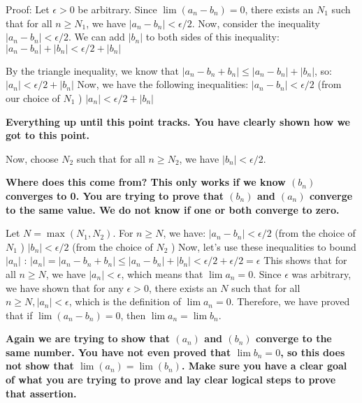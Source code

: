 \documentclass{report}
\begin{document}


Proof:
Let $\epsilon>0$ be arbitrary. Since $\lim \left(a_n-b_n\right)=0$, there exists an $N_1$ such that for all $n \geq N_1$, we have $\left|a_n-b_n\right|<\epsilon / 2$. Now, consider the inequality $\left|a_n-b_n\right|<\epsilon / 2$. We can add $\left|b_n\right|$ to both sides of this inequality: $\left|a_n-b_n\right|+\left|b_n\right|<\epsilon / 2+\left|b_n\right|$

By the triangle inequality, we know that $\left|a_n-b_n+b_n\right| \leq\left|a_n-b_n\right|+\left|b_n\right|$, so: $\left|a_n\right|<\epsilon / 2+\left|b_n\right|$ Now, we have the following inequalities: $\left|a_n-b_n\right|<\epsilon / 2$ (from our choice of $N_1$ )
$\left|a_n\right|<\epsilon / 2+\left|b_n\right|$
\par
\textbf{Everything up until this point tracks. You have clearly shown how we got to this point.}
\par
Now, choose $N_2$ such that for all $n \geq N_2$, we have $\left|b_n\right|<\epsilon / 2$. 
\par
\textbf{Where does this come from? This only works if we know $(b_n)$ converges to 0. You are trying to prove that $(b_n)$ and $(a_n)$ converge to the same value. We do not know if one or both converge to zero.}

Let $N=\max \left(N_1, N_2\right)$. For $n \geq N$, we have: $\left|a_n-b_n\right|<\epsilon / 2$ (from the choice of $N_1$ )
$\left|b_n\right|<\epsilon / 2$ (from the choice of $N_2$ )
Now, let's use these inequalities to bound $\left|a_n\right|$ :
$\left|a_n\right|=\left|a_n-b_n+b_n\right| \leq\left|a_n-b_n\right|+\left|b_n\right|<\epsilon / 2+\epsilon / 2=\epsilon$
This shows that for all $n \geq N$, we have $\left|a_n\right|<\epsilon$, which means that $\lim a_n=0$.
Since $\epsilon$ was arbitrary, we have shown that for any $\epsilon>0$, there exists an $N$ such that for all $n \geq N,\left|a_n\right|<\epsilon$, which is the definition of $\lim a_n=0$.
Therefore, we have proved that if $\lim \left(a_n-b_n\right)=0$, then $\lim a_n=\lim b_n$.
\par
\textbf{Again we are trying to show that $(a_n)$ and $(b_n)$ converge to the same number. You have not even proved that $\lim b_n = 0$, so this does not show that $\lim (a_n) = \lim (b_n)$. Make sure you have a clear goal of what you are trying to prove and lay clear logical steps to prove that assertion.}
\end{document}
